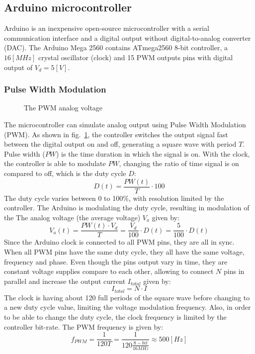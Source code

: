 \documentclass[\main/master.tex]{subfiles}
\begin{document}
\subsection{Arduino microcontroller}
Arduino is an inexpensive open-source microcontroller with a serial communication interface and a digital output without digital-to-analog converter (DAC). The Arduino Mega 2560 contains ATmega2560 8-bit controller, a $16 [MHz]$ crystal oscillator (clock) and 15 PWM outputs pins with digital output of $V_d = 5[V]$.
\subsubsection{Pulse Width Modulation}
\begin{figure}[htbp]
	\centering
	\caption[The PWM analog voltage]{The PWM analog voltage}
	\label{fig:duty_cycle}
\end{figure}
\FloatBarrier
\par\noindent
The microcontroller can simulate analog output using Pulse Width Modulation (PWM). As shown in fig.~\ref{fig:duty_cycle}, the controller switches the output signal fast between the digital output on and off, generating a square wave with period $T$. Pulse width ($PW$) is the time duration in which the signal is on. With the clock, the controller is able to modulate $PW$, changing the ratio of time signal is on compared to off, which is the duty cycle $D$:
\begin{equation}
D(t) = \frac{PW(t)}{T}\cdot 100  \label{eqn:duty cycle}
\end{equation}
The duty cycle varies between 0 to 100\%, with resolution limited by the controller. The Arduino is modulating the duty cycle, resulting in modulation of the The analog voltage (the average voltage) $V_a$ given by: 
\begin{equation}
V_a(t) = \frac{ PW(t)\cdot V_d}{ T}  = \frac{V_d}{100}\cdot D(t)  = \frac{5}{100}\cdot D(t)  \label{eqn:pwm voltage}
\end{equation}
Since the Arduino clock is connected to all PWM pins, they are all in sync. When all PWM pins have the same duty cycle, they all have the same voltage, frequency and phase. Even though the pins output vary in time, they are constant voltage supplies compare to each other, allowing to connect $N$ pins in parallel and increase the output current $I_{total}$ given by: 
\begin{equation}
I_{total} = N\cdot I   \label{eqn:pwm current}
\end{equation}
The clock is having about 120 full periods of the square wave before changing to a new duty cycle value, limiting the voltage modulation frequency. Also, in order to be able to change the duty cycle, the clock frequency is limited by the controller bit-rate. The PWM frequency is given by:
\begin{equation}
f_{PWM} = \frac{1 }{120T}= \frac{1 }{120 \frac{8-bit }{16MHz}}  \approx 500[Hz]	    \label{eqn:pwm frequency}
\end{equation}
\end{document}
